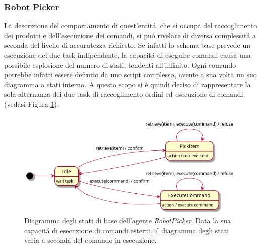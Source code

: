 \subsubsection{Robot Picker}
La descrizione del comportamento di quest'entit\'a, che si occupa del raccoglimento dei prodotti e dell'esecuzione dei comandi, si pu\'o rivelare di diversa complessit\'a a seconda del livello di accuratezza richiesto. Se infatti lo schema base prevede un esecuzione dei due task indipendente, la capacit\'a di eseguire comandi causa una possibile esplosione del numero di stati, tendenti all'infinito. Ogni comando potrebbe infatti essere definito da uno script complesso, avente a sua volta un suo diagramma a stati interno. A questo scopo si \'e quindi deciso di rappresentare la sola alternanza dei due task di raccoglimento ordini ed esecuzione di comandi (vedasi Figura \ref{fig:rp-state-diagram}).
\begin{figure}[!ht]\centering
    \includegraphics[width=\textwidth]{section/design/figure/robot_picker/state_diagram.png}
    \caption{Diagramma degli stati di base dell'agente \textit{RobotPicker}. Data la sua capacit\'a di esecuzione di comandi esterni, il diagramma degli stati varia a seconda del comando in esecuzione.}
    \label{fig:rp-state-diagram}
\end{figure}

